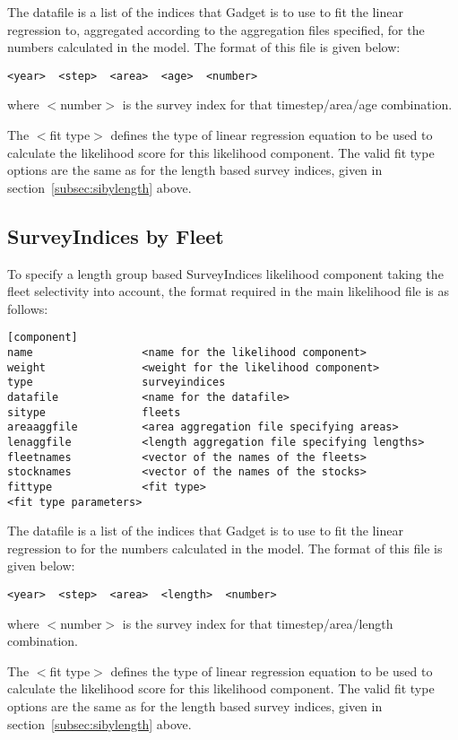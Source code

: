 \documentclass[10pt,twoside]{book}
\begin{document}
The datafile is a list of the indices that Gadget is to use to fit the linear regression to, aggregated according to the aggregation files specified, for the numbers calculated in the model.  The format of this file is given below:

{\small\begin{verbatim}
<year>  <step>  <area>  <age>  <number>
\end{verbatim}}

where $<$number$>$ is the survey index for that timestep/area/age combination.

\bigskip
The $<$fit type$>$ defines the type of linear regression equation to be used to calculate the likelihood score for this likelihood component.  The valid fit type options are the same as for the length based survey indices, given in section~\ref{subsec:sibylength} above.

\subsection{SurveyIndices by Fleet}\label{subsec:sibyfleet}
To specify a length group based SurveyIndices likelihood component taking the fleet selectivity into account, the format required in the main likelihood file is as follows:

{\small\begin{verbatim}
[component]
name                 <name for the likelihood component>
weight               <weight for the likelihood component>
type                 surveyindices
datafile             <name for the datafile>
sitype               fleets
areaaggfile          <area aggregation file specifying areas>
lenaggfile           <length aggregation file specifying lengths>
fleetnames           <vector of the names of the fleets>
stocknames           <vector of the names of the stocks>
fittype              <fit type>
<fit type parameters>
\end{verbatim}}

The datafile is a list of the indices that Gadget is to use to fit the linear regression to for the numbers calculated in the model.  The format of this file is given below:

{\small\begin{verbatim}
<year>  <step>  <area>  <length>  <number>
\end{verbatim}}

where $<$number$>$ is the survey index for that timestep/area/length combination.

\bigskip
The $<$fit type$>$ defines the type of linear regression equation to be used to calculate the likelihood score for this likelihood component.  The valid fit type options are the same as for the length based survey indices, given in section~\ref{subsec:sibylength} above.
\end{document}

